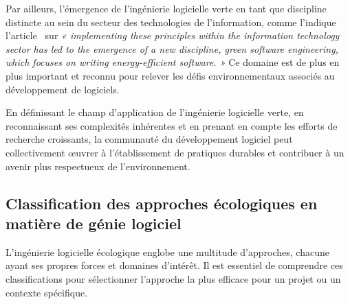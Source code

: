 Par ailleurs, l'émergence de l'ingénierie logicielle verte en tant que discipline distincte au sein du secteur des technologies de l'information, comme l'indique l'article~\cite{IntegrationSustainabilityMetrics} sur \emph{« implementing these principles within the information technology sector has led to the emergence of a new discipline, green software engineering, which focuses on writing energy-efficient software. »} Ce domaine est de plus en plus important et reconnu pour relever les défis environnementaux associés au développement de logiciels.


En définissant le champ d'application de l'ingénierie logicielle verte, en reconnaissant ses complexités inhérentes et en prenant en compte les efforts de recherche croissants, la communauté du développement logiciel peut collectivement œuvrer à l'établissement de pratiques durables et contribuer à un avenir plus respectueux de l'environnement.


\subsection{Classification des approches écologiques en matière de génie logiciel}
L'ingénierie logicielle écologique englobe une multitude d'approches, chacune ayant ses propres forces et domaines d'intérêt. Il est essentiel de comprendre ces classifications pour sélectionner l'approche la plus efficace pour un projet ou un contexte spécifique.


